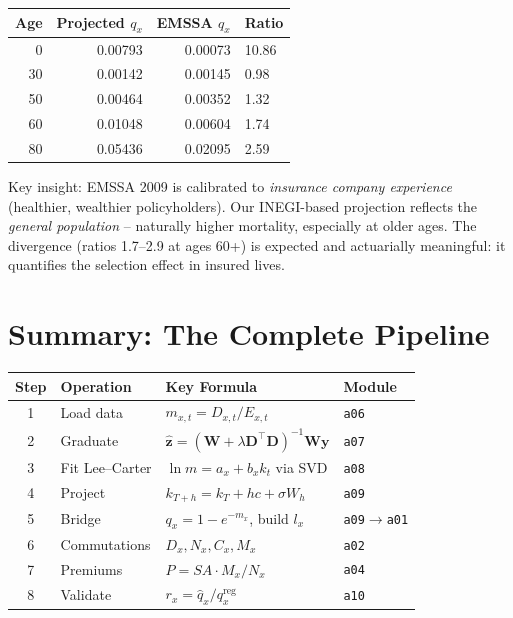 \documentclass[11pt,a4paper]{article}
\theoremstyle{definition}
\begin{document}
\begin{application}
\begin{center}
\begin{tabular}{rrrl}
\toprule
Age & Projected $q_x$ & EMSSA $q_x$ & Ratio \\
\midrule
 0 & 0.00793 & 0.00073 & 10.86 \\
30 & 0.00142 & 0.00145 & 0.98 \\
50 & 0.00464 & 0.00352 & 1.32 \\
60 & 0.01048 & 0.00604 & 1.74 \\
80 & 0.05436 & 0.02095 & 2.59 \\
\bottomrule
\end{tabular}
\end{center}

Key insight: EMSSA 2009 is calibrated to \emph{insurance company experience}
(healthier, wealthier policyholders). Our INEGI-based projection reflects
the \emph{general population} -- naturally higher mortality, especially at
older ages. The divergence (ratios 1.7--2.9 at ages 60+) is expected and
actuarially meaningful: it quantifies the selection effect in insured lives.
\end{application}

\section{Summary: The Complete Pipeline}
\label{sec:summary}

\begin{center}
\renewcommand{\arraystretch}{1.4}
\begin{tabular}{clll}
\toprule
\textbf{Step} & \textbf{Operation} & \textbf{Key Formula} & \textbf{Module} \\
\midrule
1 & Load data & $m_{x,t} = D_{x,t}/E_{x,t}$ & \texttt{a06} \\
2 & Graduate & $\hat{\bm{z}} = (\bm{W}+\lambda\bm{D}^\top\bm{D})^{-1}\bm{W}\bm{y}$ & \texttt{a07} \\
3 & Fit Lee--Carter & $\ln m = a_x + b_x k_t$ via SVD & \texttt{a08} \\
4 & Project & $k_{T+h} = k_T + hc + \sigma W_h$ & \texttt{a09} \\
5 & Bridge & $q_x = 1 - e^{-m_x}$, build $l_x$ & \texttt{a09$\to$a01} \\
6 & Commutations & $D_x, N_x, C_x, M_x$ & \texttt{a02} \\
7 & Premiums & $P = SA \cdot M_x / N_x$ & \texttt{a04} \\
8 & Validate & $r_x = \hat{q}_x / q_x^{\text{reg}}$ & \texttt{a10} \\
\bottomrule
\end{tabular}
\end{center}
\end{document}
